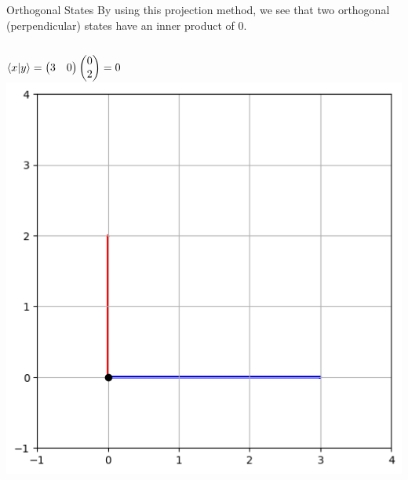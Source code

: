 \documentclass{beamer}
\begin{document}
\begin{frame}{Orthogonal States}
    By using this projection method, we see that two orthogonal (perpendicular) states have an inner product of 0.
    \begin{columns}
        \centering
        \begin{math}
            \braket{x}{y}=
            \begin{pmatrix}
                3 & 0
            \end{pmatrix}
            \begin{pmatrix}
                0 \\ 2
            \end{pmatrix} = 0
        \end{math}
        \includegraphics[width=\columnwidth]{images/vector_addition0.png}
    \end{columns}
    
\end{frame}
\end{document}
